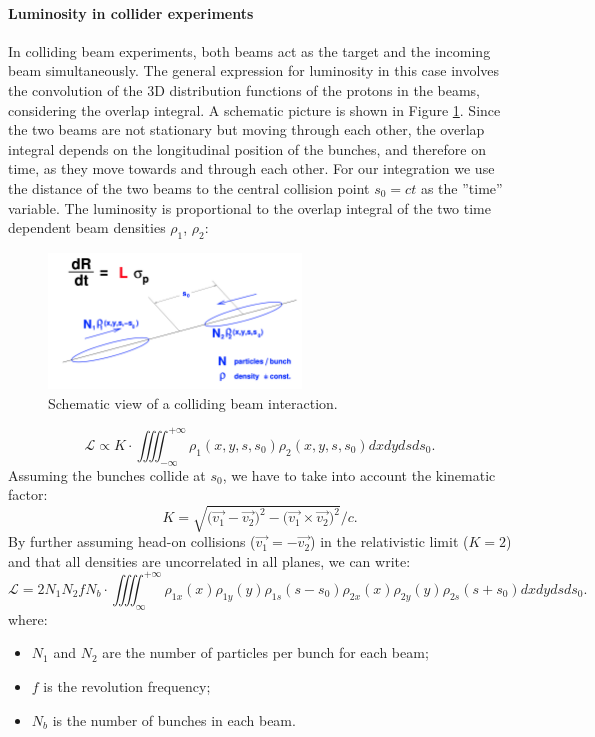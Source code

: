 \paragraph{Luminosity in collider experiments}
In colliding beam experiments, both beams act as the target and the incoming beam simultaneously. The general expression for luminosity in this case involves the convolution of the 3D distribution functions of the protons in the beams, considering the overlap integral. A schematic picture is shown in Figure \ref{fig:lumi-def}\cite{Herr:941318}. Since the two beams are not stationary but moving through each other, the overlap integral depends on the longitudinal position of the bunches, and therefore on time, as they move towards and through each other. For our integration we use the distance of the two beams to the central collision point $s_0 = ct$ as the ”time” variable. 
The luminosity is proportional to the overlap integral of the two time dependent beam densities  $\rho_1$, $\rho_2$:

\begin{figure}
    \centering
    \includegraphics[width=0.6\textwidth]{figures/luminosity_def.png}
    \caption{Schematic view of a colliding beam interaction.}
    \label{fig:lumi-def}
\end{figure}

\begin{equation}
    \mathcal{L} \propto K\cdot\iiiint_{-\infty}^{+\infty}\rho_1(x,y,s,s_0)\rho_2(x,y,s,s_0)dxdydsds_0.\label{lumi_propto}
\end{equation}
Assuming the bunches collide at $s_0$, we have to take into account the kinematic factor\cite{Moller}:
\begin{equation}
    K = \sqrt{\bigl(\vec{v_1}-\vec{v_2}\bigr)^2-\bigl(\vec{v_1} \times \vec{v_2}\bigr)^2}/c.
\end{equation}
By further assuming head-on collisions ($\vec{v_1}=-\vec{v_2}$) in the relativistic limit ($K=2$) and that all densities are uncorrelated in all planes, we can write:
\begin{equation}
        \mathcal{L} = 2 N_1 N_2 f N_b\cdot\iiiint_{\infty}^{+\infty}\rho_{1x}(x)\rho_{1y}(y)\rho_{1s}(s-s_0)\rho_{2x}(x)\rho_{2y}(y)\rho_{2s}(s+s_0)dxdydsds_0.\label{beam_overlap}
\end{equation}
where:
\begin{itemize}
    \item $ N_1$  and $N_2$  are the number of particles per bunch for each beam;
    \item $f$ is the revolution frequency;
    \item $N_b$  is the number of bunches in each beam.
\end{itemize}


